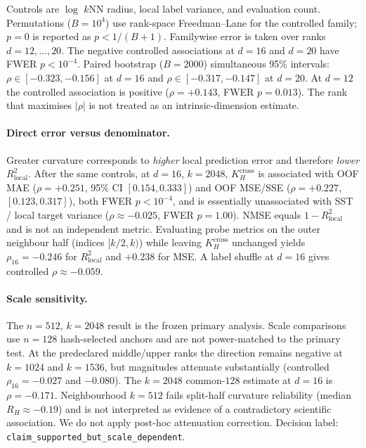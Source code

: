 \documentclass[mlabstract]{jmlr}
\begin{document}
Controls are $\log$ $k$NN radius, local label variance, and evaluation count. Permutations ($B{=}10^{4}$) use rank-space Freedman--Lane for the controlled family; $p{=}0$ is reported as $p{<}1/(B{+}1)$. Familywise error is taken over ranks $d{=}12,\ldots,20$. The negative controlled associations at $d{=}16$ and $d{=}20$ have FWER $p{<}10^{-4}$. Paired bootstrap ($B{=}2000$) simultaneous 95\% intervals: $\rho\in[-0.323,-0.156]$ at $d{=}16$ and $\rho\in[-0.317,-0.147]$ at $d{=}20$. At $d{=}12$ the controlled association is positive ($\rho{=}+0.143$, FWER $p{=}0.013$). The rank that maximises $|\rho|$ is not treated as an intrinsic-dimension estimate.

\paragraph{Direct error versus denominator.} Greater curvature corresponds to \emph{higher} local prediction error and therefore \emph{lower} $R^{2}_{\mathrm{local}}$. After the same controls, at $d{=}16$, $k{=}2048$, $K_{H}^{\mathrm{cross}}$ is associated with OOF MAE ($\rho{=}+0.251$, 95\% CI $[0.154,0.333]$) and OOF MSE/SSE ($\rho{=}+0.227$, $[0.123,0.317]$), both FWER $p{<}10^{-4}$, and is essentially unassociated with SST / local target variance ($\rho{\approx}-0.025$, FWER $p{=}1.00$). NMSE equals $1-R^{2}_{\mathrm{local}}$ and is not an independent metric. Evaluating probe metrics on the outer neighbour half (indices $[k/2,k)$) while leaving $K_{H}^{\mathrm{cross}}$ unchanged yields $\rho_{16}{=}-0.246$ for $R^{2}_{\mathrm{local}}$ and $+0.238$ for MSE. A label shuffle at $d{=}16$ gives controlled $\rho{\approx}-0.059$.

\paragraph{Scale sensitivity.} The $n{=}512$, $k{=}2048$ result is the frozen primary analysis. Scale comparisons use $n{=}128$ hash-selected anchors and are not power-matched to the primary test. At the predeclared middle/upper ranks the direction remains negative at $k{=}1024$ and $k{=}1536$, but magnitudes attenuate substantially (controlled $\rho_{16}{=}-0.027$ and $-0.080$). The $k{=}2048$ common-$128$ estimate at $d{=}16$ is $\rho{=}-0.171$. Neighbourhood $k{=}512$ fails split-half curvature reliability (median $R_{H}{\approx}-0.19$) and is not interpreted as evidence of a contradictory scientific association. We do not apply post-hoc attenuation correction. Decision label: \texttt{claim\_supported\_but\_scale\_dependent}.
\FloatBarrier
\end{document}
